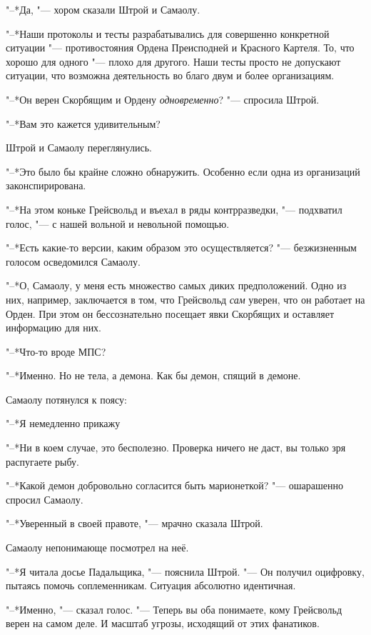 "--*Да, "--- хором сказали Штрой и Самаолу.

"--*Наши протоколы и тесты разрабатывались для совершенно конкретной ситуации "--- противостояния Ордена Преисподней и Красного Картеля.
То, что хорошо для одного "--- плохо для другого.
Наши тесты просто не допускают ситуации, что возможна деятельность во благо двум и более организациям.

"--*Он верен Скорбящим и Ордену \emph{одновременно}? "--- спросила Штрой.

"--*Вам это кажется удивительным?

Штрой и Самаолу переглянулись.

"--*Это было бы крайне сложно обнаружить.
Особенно если одна из организаций законспирирована.

"--*На этом коньке Грейсвольд и въехал в ряды контрразведки, "--- подхватил голос, "--- с нашей вольной и невольной помощью.

"--*Есть какие-то версии, каким образом это осуществляется? "--- безжизненным голосом осведомился Самаолу.

"--*О, Самаолу, у меня есть множество самых диких предположений.
Одно из них, например, заключается в том, что Грейсвольд \emph{сам} уверен, что он работает на Орден.
При этом он бессознательно посещает явки Скорбящих и оставляет информацию для них.

"--*Что-то вроде МПС\footnotemark?

"--*Именно.
Но не тела, а демона.
Как бы демон, спящий в демоне.

Самаолу потянулся к поясу:

"--*Я немедленно прикажу\ldotst

"--*Ни в коем случае, это бесполезно.
Проверка ничего не даст, вы только зря распугаете рыбу.

"--*Какой демон добровольно согласится быть марионеткой? "--- ошарашенно спросил Самаолу.

"--*Уверенный в своей правоте, "--- мрачно сказала Штрой.

Самаолу непонимающе посмотрел на неё.

"--*Я читала досье Падальщика, "--- пояснила Штрой.
"--- Он получил оцифровку, пытаясь помочь соплеменникам.
Ситуация абсолютно идентичная.

"--*Именно, "--- сказал голос.
"--- Теперь вы оба понимаете, кому Грейсвольд верен на самом деле.
И масштаб угрозы, исходящий от этих фанатиков.

